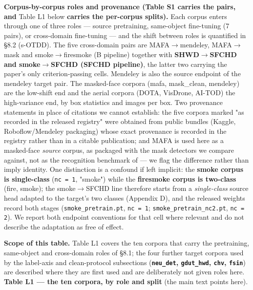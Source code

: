 \documentclass[pdflatex,sn-mathphys-ay]{sn-jnl}
\begin{document}
\textbf{Corpus-by-corpus roles and provenance (Table S1 carries the pairs, and }Table L1 below\textbf{ carries the per-corpus splits).} Each corpus enters through one of three roles --- source pretraining, same-object fine-tuning (7 pairs), or cross-domain fine-tuning --- and the shift between roles is quantified in \S{}8.2 (s-OTDD). The five cross-domain pairs are MAFA\ensuremath{\rightarrow}mendeley, MAFA\ensuremath{\rightarrow}mask and smoke\ensuremath{\rightarrow}firesmoke (B pipeline) together with \textbf{SHWD\ensuremath{\rightarrow}SFCHD and smoke\ensuremath{\rightarrow}SFCHD (SFCHD pipeline)}, the latter two carrying the paper's only criterion-passing cells. Mendeley is also the source endpoint of the mendeley target pair. The masked-face corpora (mafa, mask\_clean, mendeley) are the low-shift end and the aerial corpora (DOTA, VisDrone, AI-TOD) the high-variance end, by box statistics and images per box. Two provenance statements in place of citations we cannot establish: the five corpora marked "as recorded in the released registry" were obtained from public bundles (Kaggle, Roboflow/Mendeley packaging) whose exact provenance is recorded in the registry rather than in a citable publication; and MAFA is used here as a masked-face \emph{source} corpus, as packaged with the mask detectors we compare against, not as the recognition benchmark of \citep{kwon2021} --- we flag the difference rather than imply identity. One distinction is a confound if left implicit: the \textbf{smoke corpus is single-class} (\texttt{nc = 1}, "smoke") while the \textbf{firesmoke corpus is two-class} (fire, smoke); the smoke\ensuremath{\rightarrow}SFCHD line therefore starts from a \emph{single-class} source head adapted to the target's two classes (Appendix D), and the released weights record both stages (\texttt{smoke\_pretrain.pt}, \texttt{nc = 1}; \texttt{smoke\_pretrain\_nc2.pt}, \texttt{nc = 2}). We report both endpoint conventions for that cell where relevant and do not describe the adaptation as free of effect.

\textbf{Scope of this table.} Table L1 covers the ten corpora that carry the pretraining, same-object and cross-domain roles of \S{}8.1; the four further target corpora used by the label-axis and clean-protocol subsections (\textbf{\texttt{neu\_det}, \texttt{gdut\_hwd}, \texttt{chv}, \texttt{fsin}}) are described where they are first used and are deliberately not given roles here. \textbf{Table L1 --- the ten corpora, by role and split} (the main text points here).
\end{document}
